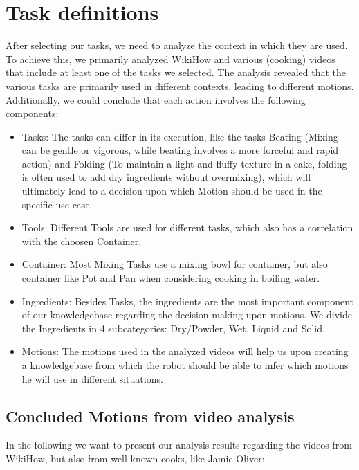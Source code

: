   \section*{Task definitions}
  After selecting our tasks, we need to analyze the context in which they are used. To achieve this, we primarily analyzed WikiHow and various (cooking) videos that include at least one of the tasks we selected. The analysis revealed that the various tasks are primarily used in different contexts, leading to different motions. Additionally, we could conclude that each action involves the following components:	
	\begin{itemize}
		\item Tasks: The tasks can differ in its execution, like the tasks Beating (Mixing can be gentle or vigorous, while beating involves a more forceful and rapid action) and Folding (To maintain a light and fluffy texture in a cake, folding is often used to add dry ingredients without overmixing), which will ultimately lead to a decision upon which Motion should be used in the specific use case.
		\item Tools: Different Tools are used for different tasks, which also has a correlation with the choosen Container.
		\item Container: Most Mixing Tasks use a mixing bowl for container, but also container like Pot and Pan when considering cooking in boiling water.
		\item Ingredients: Besides Tasks, the ingredients are the most important component of our knowledgebase regarding the decision making upon motions. We divide the Ingredients in 4 subcategories: Dry/Powder, Wet, Liquid and Solid.
		\item Motions: The motions used in the analyzed videos will help us upon creating a knowledgebase from which the robot should be able to infer which motions he will use in different situations.
	\end{itemize}
  \subsection*{Concluded Motions from video analysis}
	In the following we want to present our analysis results regarding the videos from WikiHow, but also from well known cooks, like Jamie Oliver:


